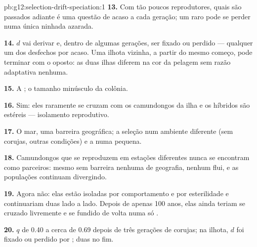 \begin{solution}{pb:g12:selection-drift-speciation:1}
\textbf{13.} Com tão poucos reprodutores, quais  são passados
adiante é uma questão de acaso a cada geração; um  raro pode se
perder numa única ninhada azarada.

\textbf{14.} $d$ vai derivar e, dentro de algumas gerações, ser fixado
ou perdido --- qualquer um dos desfechos por acaso. Uma ilhota vizinha,
a partir do mesmo começo, pode terminar com o  oposto: as duas
ilhas diferem na cor da pelagem sem razão adaptativa nenhuma.

\textbf{15.} A ; o tamanho minúsculo da colônia.

\textbf{16.} Sim: eles raramente se cruzam com os camundongos da ilha e
os híbridos são estéreis --- isolamento reprodutivo.

\textbf{17.} O mar, uma barreira geográfica; a seleção num ambiente
diferente (sem corujas, outras condições) e a  numa
 pequena.

\textbf{18.} Camundongos que se reproduzem em estações diferentes nunca
se encontram como parceiros: mesmo sem barreira nenhuma de geografia,
 nenhum flui, e as populações continuam divergindo.

\textbf{19.} Agora não: elas estão isoladas por comportamento e por
esterilidade e continuariam duas  lado a lado. Depois de apenas
100 anos, elas ainda teriam se cruzado livremente e se fundido de volta
numa só .

\textbf{20.} $q$ de 0.40 a cerca de 0.69 depois de três gerações de
corujas; na ilhota, $d$ foi fixado ou perdido por ; duas
 no fim.
\end{solution}
